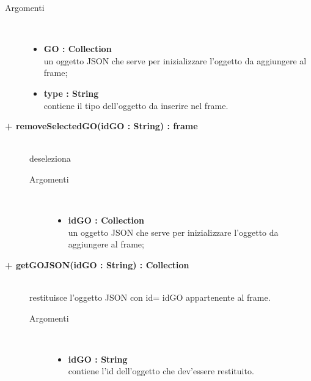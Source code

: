 \begin{description}
\begin{description}
\begin{description}
			\item[Argomenti] \hfill \\
				\begin{itemize}
						\item \textbf{GO : Collection			} \hfill \\
					un oggetto JSON che serve per inizializzare l'oggetto da aggiungere al frame;
					  	\item \textbf{type : String			} \hfill \\
					  	contiene il tipo dell'oggetto da inserire nel frame.
				\end{itemize}

\end{description}

\end{description}

\begin{description}
		\item[\textbf{+ removeSelectedGO(idGO : String) : frame			}] \hfill \\
			deseleziona  

\begin{description}
			\item[Argomenti] \hfill \\
				\begin{itemize}
						\item \textbf{idGO : Collection			} \hfill \\
					un oggetto JSON che serve per inizializzare l'oggetto da aggiungere al frame;
				\end{itemize}

\end{description}

\end{description}

\begin{description}
		\item[\textbf{+ getGOJSON(idGO : String) : Collection			}] \hfill \\
			restituisce l'oggetto JSON con id= idGO appartenente al frame.   

\begin{description}
			\item[Argomenti] \hfill \\
				\begin{itemize}
						\item \textbf{idGO : String			} \hfill \\
					contiene l'id dell'oggetto che dev'essere restituito.
				\end{itemize}


\end{description}
\end{description}
\end{description}
